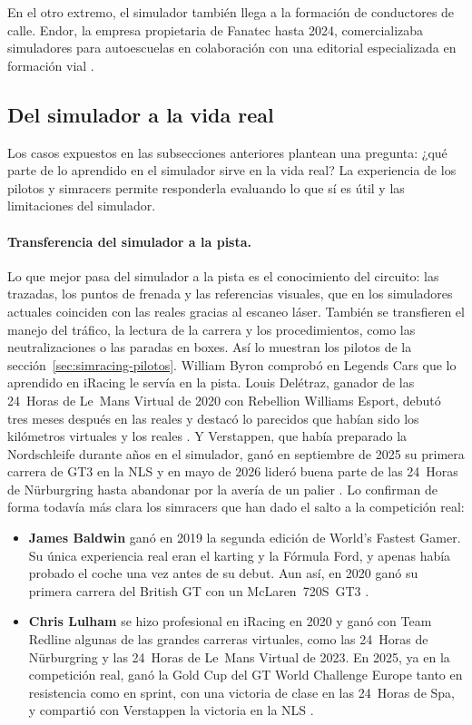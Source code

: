 En el otro extremo, el simulador también llega a la formación de conductores de calle. Endor, la empresa propietaria de Fanatec hasta 2024, comercializaba simuladores para autoescuelas en colaboración con una editorial especializada en formación vial \parencite{endor_web}.


\subsection{Del simulador a la vida real}
\label{sec:simracing-vida-real}
Los casos expuestos en las subsecciones anteriores plantean una pregunta: ¿qué parte de lo aprendido en el simulador sirve en la vida real? La experiencia de los pilotos y simracers permite responderla evaluando lo que sí es útil y las limitaciones del simulador.

\paragraph{Transferencia del simulador a la pista.}
Lo que mejor pasa del simulador a la pista es el conocimiento del circuito: las trazadas, los puntos de
frenada y las referencias visuales, que en los simuladores actuales coinciden con las reales gracias al
escaneo láser. También se transfieren el manejo del tráfico, la lectura de la carrera y los procedimientos, como las neutralizaciones o las paradas en boxes. Así lo muestran los pilotos de la sección~\ref{sec:simracing-pilotos}. William Byron comprobó en Legends Cars que lo aprendido en iRacing le servía en la pista. Louis Delétraz, ganador de las 24~Horas de Le~Mans Virtual de 2020 con Rebellion Williams Esport, debutó tres meses después en las reales y destacó lo parecidos que habían sido los kilómetros virtuales y los reales \parencite{fiawec_news}. Y Verstappen, que había preparado la Nordschleife durante años en el simulador, ganó en septiembre de 2025 su primera carrera de GT3 en la NLS y en mayo de 2026 lideró buena parte de las 24~Horas de Nürburgring hasta abandonar por la avería de un palier \parencite{nls_news, motorsport_com}. Lo confirman de forma todavía más clara los simracers que han dado el salto a la competición real:
\begin{itemize}
	\item \textbf{James Baldwin} ganó en 2019 la segunda edición de World's Fastest Gamer. Su única	experiencia real eran el karting y la Fórmula Ford, y apenas había probado el coche una vez antes de su debut. Aun así, en 2020 ganó su primera carrera del British GT con un McLaren~720S~GT3 \parencite{therace_2020_baldwin}.
	\item \textbf{Chris Lulham} se hizo profesional en iRacing en 2020 y ganó con Team Redline algunas de las grandes carreras virtuales, como las 24~Horas de Nürburgring y las 24~Horas de Le~Mans Virtual de
	2023. En 2025, ya en la competición real, ganó la Gold Cup del GT World Challenge Europe tanto en resistencia como en sprint, con una victoria de clase en las 24~Horas de Spa, y compartió con Verstappen la victoria en la NLS \parencite{traxion_news, nls_news}.
\end{itemize}
